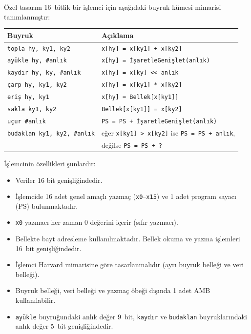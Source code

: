 
\begin{alistirma}[\zor]
Özel tasarım 16~bitlik bir işlemci için aşağıdaki buyruk kümesi mimarisi tanımlanmıştır:

\begin{center}
\small
\begin{tabular}{ll}
\toprule
\textbf{Buyruk} & \textbf{Açıklama} \\
\midrule
\texttt{topla hy, ky1, ky2} & \texttt{x[hy] = x[ky1] + x[ky2]} \\
\texttt{ayükle hy, \#anlık} & \texttt{x[hy] = İşaretleGenişlet(anlık)} \\
\texttt{kaydır hy, ky, \#anlık} & \texttt{x[hy] = x[ky] <\null< anlık} \\
\texttt{çarp hy, ky1, ky2} & \texttt{x[hy] = x[ky1] * x[ky2]} \\
\texttt{eriş hy, ky1} & \texttt{x[hy] = Bellek[x[ky1]]} \\
\texttt{sakla ky1, ky2} & \texttt{Bellek[x[ky1]] = x[ky2]} \\
\texttt{uçur \#anlık} & \texttt{PS = PS + İşaretleGenişlet(anlık)} \\
\texttt{budaklan ky1, ky2, \#anlık} & eğer \texttt{x[ky1] > x[ky2]} ise \texttt{PS = PS + anlık}, \\
 & değilse \texttt{PS = PS + ?} \\
\bottomrule
\end{tabular}
\end{center}

İşlemcinin özellikleri şunlardır:
\begin{itemize}
    \item Veriler 16 bit genişliğindedir.
    \item İşlemcide 16 adet genel amaçlı yazmaç (\texttt{x0}--\texttt{x15}) ve 1 adet program sayacı (PS) bulunmaktadır.
    \item \texttt{x0} yazmacı her zaman 0 değerini içerir (sıfır yazmacı).
    \item Bellekte bayt adresleme kullanılmaktadır. Bellek okuma ve yazma işlemleri 16~bit genişliğindedir.
    \item İşlemci Harvard mimarisine göre tasarlanmalıdır (ayrı buyruk belleği ve veri belleği).
    \item Buyruk belleği, veri belleği ve yazmaç öbeği dışında 1 adet AMB kullanılabilir.
    \item \texttt{ayükle} buyruğundaki anlık değer 9~bit, \texttt{kaydır} ve \texttt{budaklan} buyruklarındaki anlık değer 5~bit genişliğindedir.
\end{itemize}


\end{alistirma}
